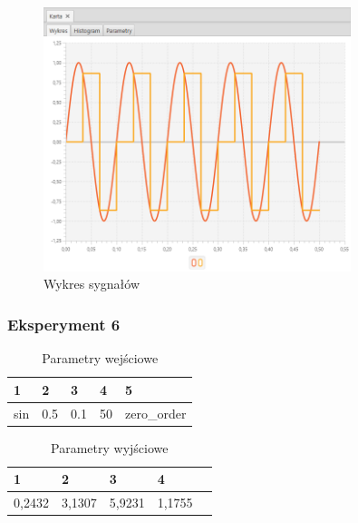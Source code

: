 \documentclass[12pt]{article}
\begin{document}
{{{                \begin{figure}[H]
                    \centering
                    \includegraphics[width=0.8\textwidth]{img/result/experiment1/05/data_draw_original_chart_recon_output_130214.png}
                    \caption{Wykres sygnałów}
                \end{figure}
            }
            \newpage

            \subsubsection{Eksperyment 6} {
                \begin{table}[H]
                    \centering
                    \begin{tabular}{|l|l|l|l|l|}
                        \hline
                        1 & 2 & 3 & 4 & 5   \\ \hline
                        sin & 0.5 & 0.1 & 50 & zero\_order    \\ \hline
                    \end{tabular}
                    \caption{Parametry wejściowe}
                \end{table}

                \begin{table}[H]
                    \centering
                    \begin{tabular}{|l|l|l|l|l|}
                        \hline
                        1 & 2 & 3 & 4   \\ \hline
                        0,2432 & 3,1307 & 5,9231 & 1,1755   \\ \hline
                    \end{tabular}
                    \caption{Parametry wyjściowe}
                \end{table}


}}}
\end{document}
